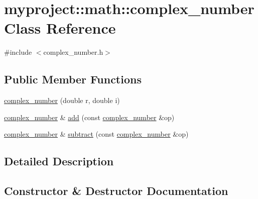 \hypertarget{classmyproject_1_1math_1_1complex__number}{}\section{myproject\+:\+:math\+:\+:complex\+\_\+number Class Reference}
\label{classmyproject_1_1math_1_1complex__number}


{\ttfamily \#include $<$complex\+\_\+number.\+h$>$}

\subsection*{Public Member Functions}
\begin{DoxyCompactItemize}
\item 
\hyperlink{classmyproject_1_1math_1_1complex__number_aaeda6f35ea0c04625c6e62530c12c295}{complex\+\_\+number} (double r, double i)
\item 
\hyperlink{classmyproject_1_1math_1_1complex__number}{complex\+\_\+number} \& \hyperlink{classmyproject_1_1math_1_1complex__number_a395975e58795371affef1d04312f6783}{add} (const \hyperlink{classmyproject_1_1math_1_1complex__number}{complex\+\_\+number} \&op)
\item 
\hyperlink{classmyproject_1_1math_1_1complex__number}{complex\+\_\+number} \& \hyperlink{classmyproject_1_1math_1_1complex__number_ad1b60335bc0b65ec6618306ee6a1bd64}{subtract} (const \hyperlink{classmyproject_1_1math_1_1complex__number}{complex\+\_\+number} \&op)
\end{DoxyCompactItemize}


\subsection{Detailed Description}


\subsection{Constructor \& Destructor Documentation}
\mbox{\label{classmyproject_1_1math_1_1complex__number_aaeda6f35ea0c04625c6e62530c12c295}} 
